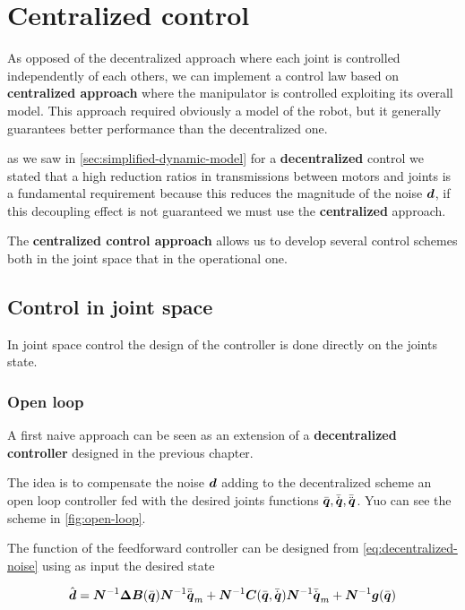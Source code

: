 \chapter{Centralized control}\label{ch:centralized-control}

As opposed of the decentralized approach where each joint is controlled independently of each others, we can implement a control law based on \textbf{centralized approach} where the manipulator is controlled exploiting its overall model.
This approach required obviously a model of the robot, but it generally guarantees better performance than the decentralized one.

\begin{nb}as we saw in \autoref{sec:simplified-dynamic-model} for a \textbf{decentralized} control we stated that a high reduction ratios in transmissions between motors and joints is a fundamental requirement because this reduces the magnitude of the noise $\boldsymbol{d}$, if this decoupling effect is not guaranteed we must use the \textbf{centralized} approach.\end{nb}

The \textbf{centralized control approach} allows us to develop several control schemes both in the joint space that in the operational one.

\section{Control in joint space}

In joint space control the design of the controller is done directly on the joints state.

\subsection{Open loop}

A first naive approach can be seen as an extension of a \textbf{decentralized controller} designed in the previous chapter.

The idea is to compensate the noise $\boldsymbol{d}$ adding to the decentralized scheme an open loop controller fed with the desired joints functions $\bar{\boldsymbol{q}}, \bar{\dot{\boldsymbol{q}}}, \bar{\ddot{\boldsymbol{q}}}$.
Yuo can see the scheme in \autoref{fig:open-loop}.

The function of the feedforward controller can be designed from \autoref{eq:decentralized-noise} using as input the desired state

\[
	\hat{\boldsymbol{d}} = \boldsymbol{N}^{-1} \boldsymbol{\Delta B}(\bar{\boldsymbol{q}}) \boldsymbol{N}^{-1} \bar{\ddot{\boldsymbol{q}}}_m +\boldsymbol{N}^{-1} \boldsymbol{C}(\bar{\boldsymbol{q}},\bar{\dot{\boldsymbol{q}}}) \boldsymbol{N}^{-1} \bar{\dot{\boldsymbol{q}}}_m + \boldsymbol{N}^{-1} \boldsymbol{g}(\bar{\boldsymbol{q}})
\]

